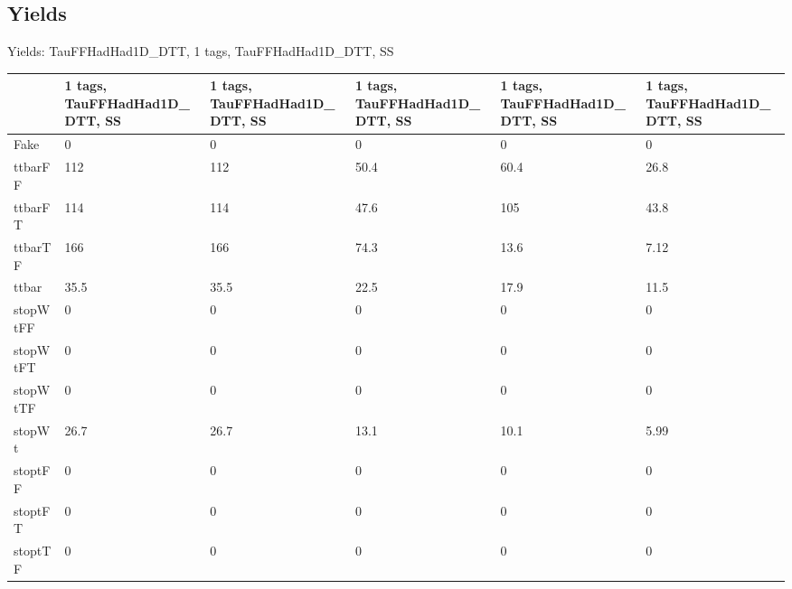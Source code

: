 
\subsection{Yields}

\begin{frame}{Yields: TauFFHadHad1D\_DTT, 1 tags, TauFFHadHad1D\_DTT, SS}
\begin{center}
  \begin{tabular}{l| >{\centering\let\newline\\\arraybackslash\hspace{0pt}}m{1.4cm}| >{\centering\let\newline\\\arraybackslash\hspace{0pt}}m{1.4cm}| >{\centering\let\newline\\\arraybackslash\hspace{0pt}}m{1.4cm}| >{\centering\let\newline\\\arraybackslash\hspace{0pt}}m{1.4cm}| >{\centering\let\newline\\\arraybackslash\hspace{0pt}}m{1.4cm}}
    & 1 tags, TauFFHadHad1D\_DTT, SS & 1 tags, TauFFHadHad1D\_DTT, SS & 1 tags, TauFFHadHad1D\_DTT, SS & 1 tags, TauFFHadHad1D\_DTT, SS & 1 tags, TauFFHadHad1D\_DTT, SS \\
 \hline \hline
    Fake& 0 & 0 & 0 & 0 & 0 \\
 \hline
    ttbarFF& 112 & 112 & 50.4 & 60.4 & 26.8 \\
 \hline
    ttbarFT& 114 & 114 & 47.6 & 105 & 43.8 \\
 \hline
    ttbarTF& 166 & 166 & 74.3 & 13.6 & 7.12 \\
 \hline
    ttbar& 35.5 & 35.5 & 22.5 & 17.9 & 11.5 \\
 \hline
    stopWtFF& 0 & 0 & 0 & 0 & 0 \\
 \hline
    stopWtFT& 0 & 0 & 0 & 0 & 0 \\
 \hline
    stopWtTF& 0 & 0 & 0 & 0 & 0 \\
 \hline
    stopWt& 26.7 & 26.7 & 13.1 & 10.1 & 5.99 \\
 \hline
    stoptFF& 0 & 0 & 0 & 0 & 0 \\
 \hline
    stoptFT& 0 & 0 & 0 & 0 & 0 \\
 \hline
    stoptTF& 0 & 0 & 0 & 0 & 0 \\

\end{tabular}
\end{center}
\end{frame}
